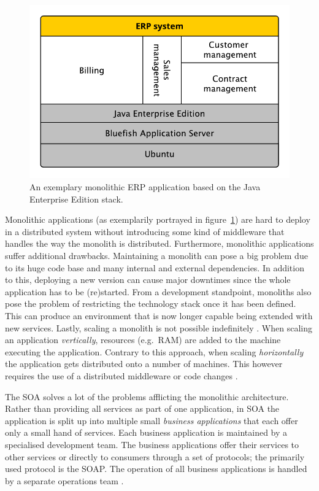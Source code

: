 \begin{figure}[H]
\begin{center}
  \includegraphics[scale=0.7]{images/figures/monolith_example.pdf}
\end{center}
\caption{An exemplary monolithic \ac{ERP} application based on the Java
Enterprise Edition stack.}%
\label{fig:monolith_example}
\end{figure}

Monolithic applications (as exemplarily portrayed in
figure~\ref{fig:monolith_example}) are hard to deploy in a distributed system
without introducing some kind of middleware that handles the way the monolith
is distributed. Furthermore, monolithic applications suffer additional
drawbacks. Maintaining a monolith can pose a big problem due to its huge code
base and many internal and external dependencies. In addition to this,
deploying a new version can cause major downtimes since the whole application
has to be (re)started. From a development standpoint, monoliths also pose the
problem of restricting the technology stack once it has been defined. This can
produce an environment that is now longer capable being extended with new
services. Lastly, scaling a monolith is not possible indefinitely \autocite[p.
2]{DragoniMicroservicesyesterdaytoday2016}. When scaling an application
\textit{vertically}, resources (e.g.\ \ac{RAM}) are added to the machine
executing the application. Contrary to this approach, when scaling
\textit{horizontally} the application gets distributed onto a number of
machines. This however requires the use of a distributed middleware or code
changes \autocite[Ch. 1.1.1]{LuksaKubernetesAction2017}.

The \ac{SOA} solves a lot of the problems afflicting the monolithic
architecture. Rather than providing all services as part of one application, in
\ac{SOA} the application is split up into multiple small \textit{business
applications} that each offer only a small hand of services. Each business
application is maintained by a specialised development team. The business
applications offer their services to other services or directly to consumers
through a set of protocols; the primarily used protocol is the \ac{SOAP}. The
operation of all business applications is handled by a separate operations team
\autocite[p. 584]{VillamizarEvaluatingmonolithicmicroservice2015}.

